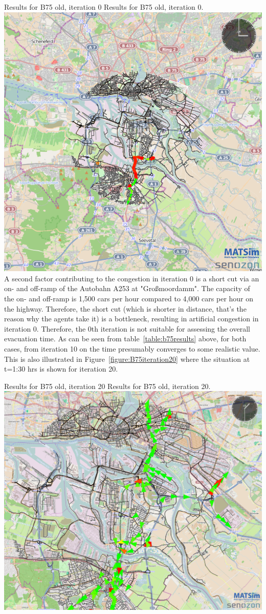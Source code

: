 \createfigure%
{Results for B75 old, iteration 0}%
{Results for B75 old, iteration 0.}%
{\label{fig:B75iteration0}}%
{\includegraphics[width=0.7\linewidth]{using/figures/B75iteration0}}%
{}
A second factor contributing to the congestion in iteration 0 is a short cut via an on- and off-ramp of the Autobahn A253 at "Gro{\ss}moordamm". The capacity of the on- and off-ramp is 1,500 cars per hour compared to 4,000 cars per hour on the highway. Therefore, the short cut (which is shorter in distance, that's the reason why the agents take it) is a bottleneck, resulting in artificial congestion in iteration 0.
Therefore, the 0th iteration is not suitable for assessing the overall evacuation time. As can be seen from table~\ref{table:b75results} above, for both cases, from iteration 10 on the time presumably converges to some realistic value. This is also illustrated in Figure~\ref{figure:B75iteration20} where the situation at t=1:30 hrs is shown for iteration 20.


\createfigure%
{Results for B75 old, iteration 20}%
{Results for B75 old, iteration 20.}%
{\label{fig:B75iteration20}}%
{\includegraphics[width=0.7\linewidth]{using/figures/B75iteration20}}%
{}

